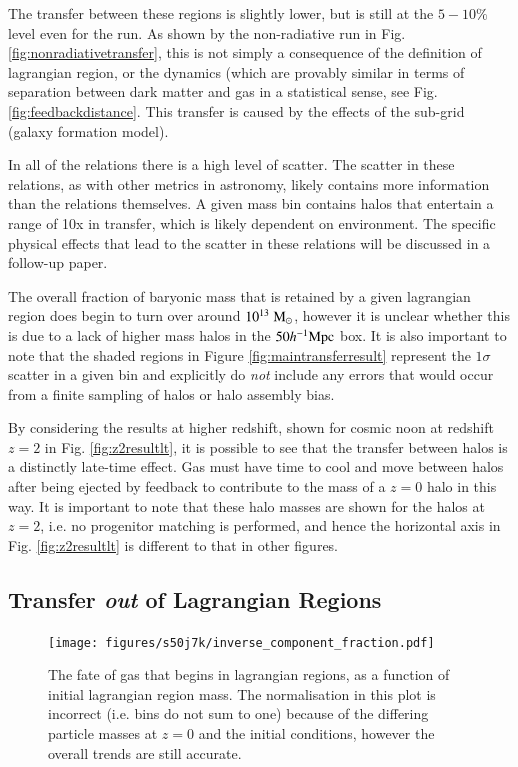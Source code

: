The transfer between these regions is slightly lower, but is still at the
$5-10\%$ level even for the \nojet{} run. As shown by the non-radiative run
in Fig. \ref{fig:nonradiativetransfer}, this is not simply a consequence of
the definition of lagrangian region, or the dynamics (which are provably
similar in terms of separation between dark matter and gas in a statistical
sense, see Fig. \ref{fig:feedbackdistance}. This transfer is caused by the
effects of the sub-grid (galaxy formation model).

In all of the relations there is a high level of scatter. The scatter in these
relations, as with other metrics in astronomy, likely contains more information 
than the relations themselves. A given mass bin contains halos that entertain a range
of 10x in transfer, which is likely dependent on environment. The specific physical
effects that lead to the scatter in these relations will be discussed in a follow-up
paper.

The overall fraction of baryonic mass that is retained by a given lagrangian
region does begin to turn over around $10^{13} \;{\rm M}_{\odot}{}$, however it is unclear
whether this is due to a lack of higher mass halos in the $50 h^{-1}{\rm Mpc}{}$ box. It
is also important to note that the shaded regions in Figure
\ref{fig:maintransferresult} represent the $1\sigma$ scatter in a given bin
and explicitly do \emph{not} include any errors that would occur from a finite
sampling of halos or halo assembly bias.


By considering the results at higher redshift, shown for cosmic noon at redshift
$z=2$ in Fig. \ref{fig:z2resultlt}, it is possible to see that the transfer
between halos is a distinctly late-time effect. Gas must have time to cool and
move between halos after being ejected by feedback to contribute to the mass
of a $z=0$ halo in this way. It is important to note that these halo masses are
shown for the halos at $z=2$, i.e. no progenitor matching is performed, and hence
the horizontal axis in Fig. \ref{fig:z2resultlt} is different to that in other
figures.

\subsection{Transfer \emph{out} of Lagrangian Regions}

\begin{figure}
	\centering
	\texttt{[image: figures/s50j7k/inverse\_component\_fraction.pdf]}
	\vspace{-0.7cm}
	\caption{The fate of gas that begins in lagrangian regions, as a function of
	initial lagrangian region mass. The normalisation in this plot is incorrect
	(i.e. bins do not sum to one) because of the differing particle masses at 
	$z=0$ and the initial conditions, however the overall trends are still 
	accurate.  }
	\label{fig:transferoutoflrs}
\end{figure}

